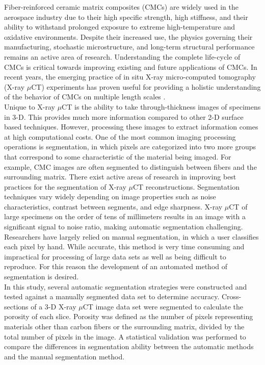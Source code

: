\documentclass[11pt, twocolumn]{article}
\begin{document}
Fiber-reinforced ceramic matrix composites (CMCs) are widely used in the aerospace industry due to their high specific strength, high stiffness, and their ability to withstand prolonged exposure to extreme high-temperature and oxidative environments. Despite their increased use, the physics governing their manufacturing, stochastic microstructure, and long-term structural performance remains an active area of research. Understanding the complete life-cycle of CMCs is critical towards improving  existing and future applications of CMCs. In recent years, the emerging practice of in situ X-ray micro-computed tomography (X-ray $\mu$CT) experiments has proven useful for providing a holistic understanding of the behavior of CMCs on multiple length scales \cite{Larson,Bale,Bale2,Cox,Haboub,Marshall}.\\
Unique to X-ray $\mu$CT is the ability to take through-thickness images of specimens in 3-D. This provides much more information compared to other 2-D surface based techniques. However, processing these images to extract information comes at high computational costs. One of the most common imaging processing operations is segmentation, in which pixels are categorized into two more groups that correspond to some characteristic of the material being imaged. For example, CMC images are often segmented to distinguish between fibers and the surrounding matrix. There exist active areas of research in improving best practices for the segmentation of X-ray $\mu$CT reconstructions. Segmentation techniques vary widely depending on image properties such as noise characteristics, contrast between segments, and edge sharpness. X-ray $\mu$CT of large specimens on the order of tens of millimeters results in an image with a significant signal to noise ratio, making automatic segmentation challenging. Researchers have largely relied on manual segmentation, in which a user classifies each pixel by hand. While accurate, this method is very time consuming and impractical for processing of large data sets as well as being difficult to reproduce. For this reason the development of an automated method of segmentation is desired.\\
In this study, several automatic segmentation strategies were constructed and tested against a manually segmented data set to determine accuracy. Cross-sections of a 3-D X-ray $\mu$CT image data set were segmented to calculate the porosity of each slice. Porosity was defined as the number of pixels representing materials other than carbon fibers or the surrounding matrix, divided by the total number of pixels in the image. A statistical validation was performed to compare the differences in segmentation ability between the automatic methods and the manual segmentation method.
\end{document}
